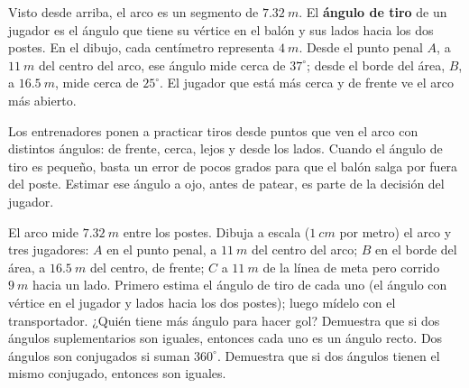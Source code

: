 \documentclass[11pt]{article}
\begin{document}
\begin{ejemplo}
Visto desde arriba, el arco es un segmento de $\qty{7,32}{m}$. El \textbf{ángulo de tiro} de un
jugador es el ángulo que tiene su vértice en el balón y sus lados hacia los dos postes. En el
dibujo, cada centímetro representa $\qty{4}{m}$. Desde el punto penal $A$, a $\qty{11}{m}$ del
centro del arco, ese ángulo mide cerca de $37^\circ$; desde el borde del área, $B$, a
$\qty{16,5}{m}$, mide cerca de $25^\circ$. El jugador que está más cerca y de frente ve el arco
más abierto.

\begin{center}
\end{center}
\end{ejemplo}

\begin{aplicacion}
Los entrenadores ponen a practicar tiros desde puntos que ven el arco con distintos ángulos: de
frente, cerca, lejos y desde los lados. Cuando el ángulo de tiro es pequeño, basta un error de
pocos grados para que el balón salga por fuera del poste. Estimar ese ángulo a ojo, antes de
patear, es parte de la decisión del jugador.
\end{aplicacion}

\begin{preguntas}
\pregunta El arco mide $\qty{7,32}{m}$ entre los postes. Dibuja a escala ($\qty{1}{cm}$ por
metro) el arco y tres jugadores: $A$ en el punto penal, a $\qty{11}{m}$ del centro del arco;
$B$ en el borde del área, a $\qty{16,5}{m}$ del centro, de frente; $C$ a $\qty{11}{m}$ de la
línea de meta pero corrido $\qty{9}{m}$ hacia un lado. Primero estima el ángulo de tiro de cada
uno (el ángulo con vértice en el jugador y lados hacia los dos postes); luego mídelo con el
transportador. ¿Quién tiene más ángulo para hacer gol?
\espacio{5cm}
\pregunta Demuestra que si dos ángulos suplementarios son iguales, entonces cada uno es un
ángulo recto.
\pregunta Dos ángulos son conjugados si suman $360^\circ$. Demuestra que si dos ángulos tienen
el mismo conjugado, entonces son iguales.
\end{preguntas}
\end{document}
